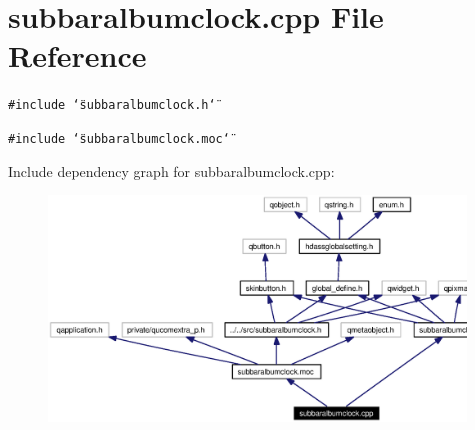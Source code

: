 \section{subbaralbumclock.cpp File Reference}
\label{subbaralbumclock_8cpp}


{\tt \#include \char`\"{}subbaralbumclock.h\char`\"{}}\par
{\tt \#include \char`\"{}subbaralbumclock.moc\char`\"{}}\par


Include dependency graph for subbaralbumclock.cpp:\begin{figure}[H]
\begin{center}
\leavevmode
\includegraphics[width=314pt]{subbaralbumclock_8cpp__incl}
\end{center}
\end{figure}
